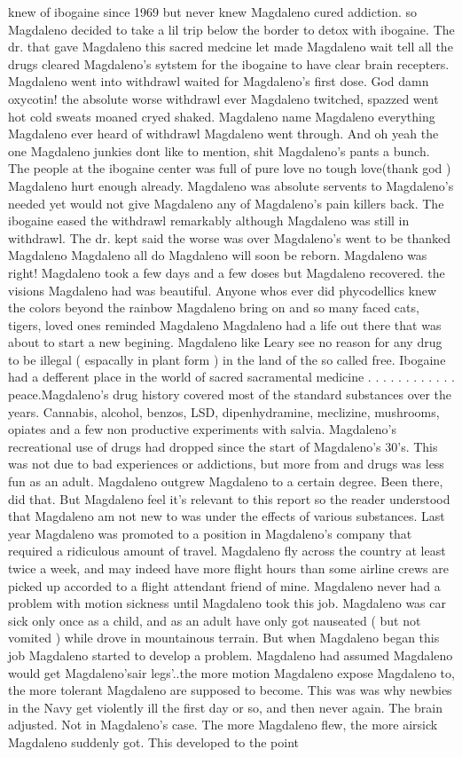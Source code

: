 \documentclass[12pt]{book}
\begin{document}
knew of ibogaine since 1969 but never knew Magdaleno cured addiction. so Magdaleno decided to take a lil trip below the border to detox with ibogaine. The dr. that gave Magdaleno this sacred medcine let made Magdaleno wait tell all the drugs cleared Magdaleno's sytstem for the ibogaine to have clear brain recepters. Magdaleno went into withdrawl waited for Magdaleno's first dose. God damn oxycotin! the absolute worse withdrawl ever Magdaleno twitched, spazzed went hot cold sweats moaned cryed shaked. Magdaleno name Magdaleno everything Magdaleno ever heard of withdrawl Magdaleno went through. And oh yeah the one Magdaleno junkies dont like to mention, shit Magdaleno's pants a bunch. The people at the ibogaine center was full of pure love no tough love(thank god ) Magdaleno hurt enough already. Magdaleno was absolute servents to Magdaleno's needed yet would not give Magdaleno any of Magdaleno's pain killers back. The ibogaine eased the withdrawl remarkably although Magdaleno was still in withdrawl. The dr. kept said the worse was over Magdaleno's went to be thanked Magdaleno Magdaleno all do Magdaleno will soon be reborn. Magdaleno was right! Magdaleno took a few days and a few doses but Magdaleno recovered. the visions Magdaleno had was beautiful. Anyone whos ever did phycodellics knew the colors beyond the rainbow Magdaleno bring on and so many faced cats, tigers, loved ones reminded Magdaleno Magdaleno had a life out there that was about to start a new begining. Magdaleno like Leary see no reason for any drug to be illegal ( espacally in plant form ) in the land of the so called free. Ibogaine had a defferent place in the world of sacred sacramental medicine . . .   . . .   . . .   . . .  peace.Magdaleno's drug history covered most of the standard substances over the years. Cannabis, alcohol, benzos, LSD, dipenhydramine, meclizine, mushrooms, opiates and a few non productive experiments with salvia. Magdaleno's recreational use of drugs had dropped since the start of Magdaleno's 30's. This was not due to bad experiences or addictions, but more from and drugs was less fun as an adult. Magdaleno outgrew Magdaleno to a certain degree. Been there, did that. But Magdaleno feel it's relevant to this report so the reader understood that Magdaleno am not new to was under the effects of various substances. Last year Magdaleno was promoted to a position in Magdaleno's company that required a ridiculous amount of travel. Magdaleno fly across the country at least twice a week, and may indeed have more flight hours than some airline crews are picked up accorded to a flight attendant friend of mine. Magdaleno never had a problem with motion sickness until Magdaleno took this job. Magdaleno was car sick only once as a child, and as an adult have only got nauseated ( but not vomited ) while drove in mountainous terrain. But when Magdaleno began this job Magdaleno started to develop a problem. Magdaleno had assumed Magdaleno would get Magdaleno'sair legs'..the more motion Magdaleno expose Magdaleno to, the more tolerant Magdaleno are supposed to become. This was was why newbies in the Navy get violently ill the first day or so, and then never again. The brain adjusted. Not in Magdaleno's case. The more Magdaleno flew, the more airsick Magdaleno suddenly got. This developed to the point 
\end{document}
